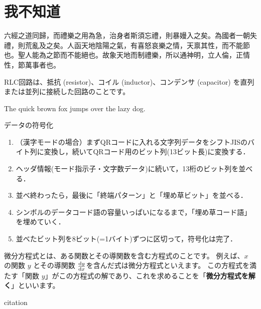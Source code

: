 \section{我不知道}

 {\genseki 六經之道同歸}，而禮樂之用為急，治身者斯須忘禮，則暴嫚入之矣。為國者一朝失禮，則荒亂及之矣。人函天地陰陽之氣，有喜怒哀樂之情，天禀其性，而不能節也。聖人能為之節而不能絕也。故象天地而制禮樂，所以通神明，立人倫，正情性，節萬事者也。

RLC回路は、抵抗 (resistor)、コイル (inductor)、コンデンサ (capacitor) を直列または並列に接続した回路のことです。

The quick brown fox jumps over the lazy dog.

データの符号化
\begin{enumerate}
	\item （漢字モードの場合）まずQRコードに入れる文字列データをシフトJISのバイト列に変換し，続いてQRコード用のビット列(13ビット長)に変換する．
	\item ヘッダ情報(モード指示子・文字数データ)に続いて，13桁のビット列を並べる．
	\item 並べ終わったら，最後に「終端パターン」と「埋め草ビット」を並べる．
	\item シンボルのデータコード語の容量いっぱいになるまで，「埋め草コード語」を埋めていく．
	\item 並べたビット列を8ビット(=1バイト)ずつに区切って，符号化は完了．
\end{enumerate}

微分方程式とは、ある関数とその導関数を含む方程式のことです。
例えば、\(x\) の関数 \(y\) とその導関数 \(\dv{y}{x}\)を含んだ式は微分方程式といえます。
この方程式を満たす「関数 \(y\)」がこの方程式の解であり、これを求めることを「\textbf{微分方程式を解く}」といいます。

citation \cite{sizesuu}

